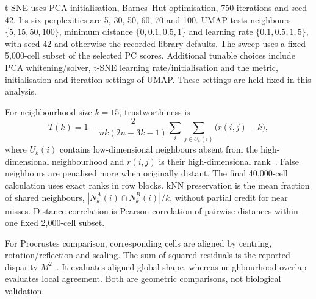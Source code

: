 \documentclass[11pt,a4paper]{article}
\begin{document}
t-SNE uses PCA initialisation, Barnes--Hut optimisation, 750 iterations and seed 42. Its six perplexities are 5, 30, 50, 60, 70 and 100. UMAP tests neighbours $\{5,15,50,100\}$, minimum distance $\{0,0.1,0.5,1\}$ and learning rate $\{0.1,0.5,1,5\}$, with seed 42 and otherwise the recorded library defaults. The sweep uses a fixed 5,000-cell subset of the selected PC scores. Additional tunable choices include PCA whitening/solver, t-SNE learning rate/initialisation and the metric, initialisation and iteration settings of UMAP. These settings are held fixed in this analysis.

For neighbourhood size $k=15$, trustworthiness is
\[
T(k)=1-\frac{2}{nk(2n-3k-1)}\sum_i\sum_{j\in U_k(i)}\bigl(r(i,j)-k\bigr),
\]
where $U_k(i)$ contains low-dimensional neighbours absent from the high-dimensional neighbourhood and $r(i,j)$ is their high-dimensional rank~\cite{trust}. False neighbours are penalised more when originally distant. The final 40,000-cell calculation uses exact ranks in row blocks. kNN preservation is the mean fraction of shared neighbours, $|N_k^A(i)\cap N_k^B(i)|/k$, without partial credit for near misses. Distance correlation is Pearson correlation of pairwise distances within one fixed 2,000-cell subset.

For Procrustes comparison, corresponding cells are aligned by centring, rotation/reflection and scaling. The sum of squared residuals is the reported disparity $M^2$~\cite{scipy}. It evaluates aligned global shape, whereas neighbourhood overlap evaluates local agreement. Both are geometric comparisons, not biological validation.

\begin{table}[htb]\centering\small

\caption{The complete t-SNE sweep. Perplexity 70 wins by trustworthiness, whereas perplexity 30 has slightly higher exact-neighbour overlap. Parameter selection therefore depends on the declared criterion.}
\label{tab:tsnesweep}
\end{table}

\begin{table}[htb]\centering\small

\caption{UMAP learning-rate selection: mean trustworthiness of the two fixed configurations $(n,d)=(5,0)$ and $(50,0.1)$. Learning rate 0.1 wins this mean. Selection does not use the best single configuration across all rates.}
\end{table}
\end{document}
